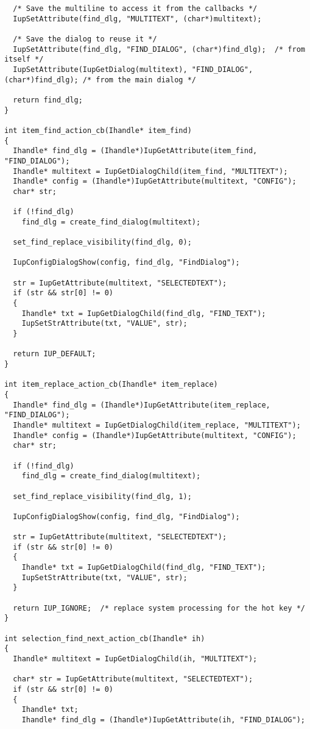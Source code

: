 \documentclass{ctexart}
\begin{document}
\begin{lstlisting}
  /* Save the multiline to access it from the callbacks */
  IupSetAttribute(find_dlg, "MULTITEXT", (char*)multitext);

  /* Save the dialog to reuse it */
  IupSetAttribute(find_dlg, "FIND_DIALOG", (char*)find_dlg);  /* from itself */
  IupSetAttribute(IupGetDialog(multitext), "FIND_DIALOG", (char*)find_dlg); /* from the main dialog */

  return find_dlg;
}

int item_find_action_cb(Ihandle* item_find)
{
  Ihandle* find_dlg = (Ihandle*)IupGetAttribute(item_find, "FIND_DIALOG");
  Ihandle* multitext = IupGetDialogChild(item_find, "MULTITEXT");
  Ihandle* config = (Ihandle*)IupGetAttribute(multitext, "CONFIG");
  char* str;

  if (!find_dlg)
    find_dlg = create_find_dialog(multitext);

  set_find_replace_visibility(find_dlg, 0);

  IupConfigDialogShow(config, find_dlg, "FindDialog");

  str = IupGetAttribute(multitext, "SELECTEDTEXT");
  if (str && str[0] != 0)
  {
    Ihandle* txt = IupGetDialogChild(find_dlg, "FIND_TEXT");
    IupSetStrAttribute(txt, "VALUE", str);
  }

  return IUP_DEFAULT;
}

int item_replace_action_cb(Ihandle* item_replace)
{
  Ihandle* find_dlg = (Ihandle*)IupGetAttribute(item_replace, "FIND_DIALOG");
  Ihandle* multitext = IupGetDialogChild(item_replace, "MULTITEXT");
  Ihandle* config = (Ihandle*)IupGetAttribute(multitext, "CONFIG");
  char* str;

  if (!find_dlg)
    find_dlg = create_find_dialog(multitext);

  set_find_replace_visibility(find_dlg, 1);

  IupConfigDialogShow(config, find_dlg, "FindDialog");

  str = IupGetAttribute(multitext, "SELECTEDTEXT");
  if (str && str[0] != 0)
  {
    Ihandle* txt = IupGetDialogChild(find_dlg, "FIND_TEXT");
    IupSetStrAttribute(txt, "VALUE", str);
  }

  return IUP_IGNORE;  /* replace system processing for the hot key */
}

int selection_find_next_action_cb(Ihandle* ih)
{
  Ihandle* multitext = IupGetDialogChild(ih, "MULTITEXT");

  char* str = IupGetAttribute(multitext, "SELECTEDTEXT");
  if (str && str[0] != 0)
  {
    Ihandle* txt;
    Ihandle* find_dlg = (Ihandle*)IupGetAttribute(ih, "FIND_DIALOG");


\end{lstlisting}
\end{document}
